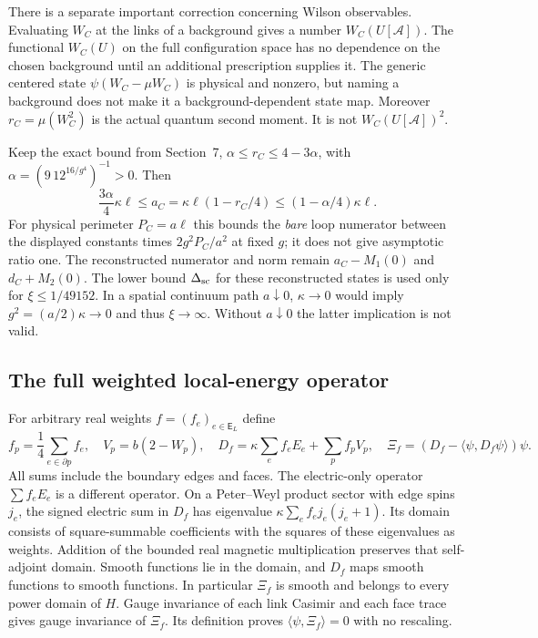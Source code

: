 There is a separate important correction concerning Wilson observables.
Evaluating $W_C$ at the links of a background gives a number $W_C(U[\mathcal A])$.
The functional $W_C(U)$ on the full configuration space has no dependence
on the chosen background until an additional prescription supplies it.
The generic centered state $\psi(W_C-\mu W_C)$ is physical and nonzero,
but naming a background does not make it a background-dependent state map.
Moreover $r_C=\mu(W_C^2)$ is the actual quantum second moment. It is not
$W_C(U[\mathcal A])^2$.

Keep the exact bound from Section~7,
$\alpha\le r_C\le4-3\alpha$, with
$\alpha=(9\,12^{16/g^4})^{-1}>0$. Then
\begin{equation}\label{eq:fabel-loop-scale-corrected}
 \frac{3\alpha}{4}\kappa\ell\le
 a_C=\kappa\ell(1-r_C/4)
 \le(1-\alpha/4)\kappa\ell .
\end{equation}
For physical perimeter $P_C=a\ell$ this bounds the \emph{bare} loop
numerator between the displayed constants times $2g^2P_C/a^2$ at fixed $g$;
it does not give asymptotic ratio one. The reconstructed numerator and norm
remain $a_C-M_1(0)$ and $d_C+M_2(0)$.
The lower bound $\Delta_{\rm sc}$ for these reconstructed states is used
only for $\xi\le1/49152$. In a spatial continuum path $a\downarrow0$,
$\kappa\to0$ would imply $g^2=(a/2)\kappa\to0$ and thus $\xi\to\infty$.
Without $a\downarrow0$ the latter implication is not valid.

\subsection{The full weighted local-energy operator}
For arbitrary real weights $f=(f_e)_{e\in\mathsf E_L}$ define
\begin{equation}\label{eq:fabel-local-D}
 f_p=\frac14\sum_{e\in\partial p}f_e,\quad
 V_p=b(2-W_p),\quad
 D_f=\kappa\sum_ef_eE_e+\sum_pf_pV_p,\quad
 \Xi_f=(D_f-\langle\psi,D_f\psi\rangle)\psi .
\end{equation}
All sums include the boundary edges and faces.
The electric-only operator $\sum f_eE_e$ is a different operator.
On a Peter--Weyl product sector with edge spins $j_e$, the signed electric
sum in $D_f$ has eigenvalue $\kappa\sum_ef_ej_e(j_e+1)$.
Its domain consists of square-summable coefficients with the squares of
these eigenvalues as weights. Addition of the bounded real magnetic
multiplication preserves that self-adjoint domain. Smooth functions lie in
the domain, and $D_f$ maps smooth functions to smooth functions.
In particular $\Xi_f$ is smooth and belongs to every power domain of $H$.
Gauge invariance of each link Casimir and each face trace gives
gauge invariance of $\Xi_f$. Its definition proves
$\langle\psi,\Xi_f\rangle=0$ with no rescaling.

